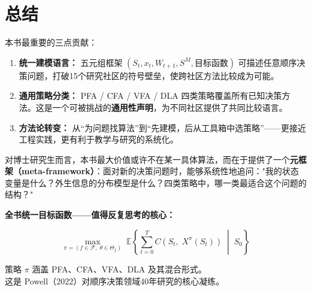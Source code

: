 \documentclass[11pt, a4paper]{article}
\begin{document}
\section{总结}

本书最重要的三点贡献：

\begin{enumerate}[leftmargin=2em, label=\textbf{\arabic*.}, itemsep=4pt]
  \item \textbf{统一建模语言：} 五元组框架 $(S_t, x_t, W_{t+1}, S^M, \text{目标函数})$ 可描述任意顺序决策问题，打破15个研究社区的符号壁垒，使跨社区方法比较成为可能。

  \item \textbf{通用策略分类：} PFA / CFA / VFA / DLA 四类策略覆盖所有已知决策方法。这是一个可被挑战的\textbf{通用性声明}，为不同社区提供了共同比较语言。

  \item \textbf{方法论转变：} 从``为问题找算法''到``先建模，后从工具箱中选策略''——更接近工程实践，更有利于教学与研究的系统化。
\end{enumerate}

\noindent 对博士研究生而言，本书最大价值或许不在某一具体算法，而在于提供了一个\textbf{元框架（meta-framework）}：面对新的决策问题时，能够系统性地追问："我的状态变量是什么？外生信息的分布模型是什么？四类策略中，哪一类最适合这个问题的结构？"

\begin{tcolorbox}[formulabox]
\begin{center}
\textbf{全书统一目标函数——值得反复思考的核心：}
\end{center}
\begin{equation}
  \boxed{
  \max_{\pi = (f \in \mathcal{F},\; \theta \in \Theta_f)}\; \mathbb{E}\!\left\{
    \sum_{t=0}^{T} C(S_t,\; X^\pi(S_t)) \;\middle|\; S_0
  \right\}
  }
  \label{eq:final_unified}
\end{equation}
\begin{center}
策略 $\pi$ 涵盖 PFA、CFA、VFA、DLA 及其混合形式。\\
这是 Powell（2022）对顺序决策领域40年研究的核心凝练。
\end{center}
\end{tcolorbox}
\end{document}
